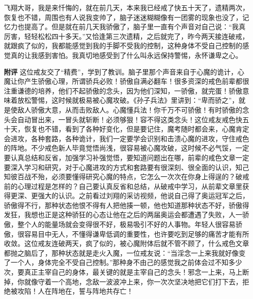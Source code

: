 \begin{case}
    飞翔大哥，我是来忏悔的，就在前几天，本来我已经戒了快五十天了，遗精两次，恢复也不错，周围也有人说我变帅了，脑子迷迷糊糊像有一团雾的现象也没了，记忆力也提高了。但是就在前几天我骄傲了，脑子里一直有个声音对自己说：“我真厉害，轻轻松松四十多天。”又恰逢第三次遗精，之后就完了，昨今两天接连破戒，就跟疯了似的，我都能感觉到我的手脚不受我的控制，这种身体不受自己控制的感觉真的让我感到害怕。我真切地感受到了什么叫永远保持警惕，永怀谦卑之心。

    \textbf{附评} 这位戒友交了“精费”，学到了教训。脑子里那个声音来自于心魔的诡计，心魔让你产生骄傲心理，所谓骄兵必败！骄傲自满必翻车！很多资深的戒色前辈都很注重谦德的培养，他们不起骄傲的念头，因为他们深知，一骄傲，就完蛋！骄傲意味着放松警惕，这时候就极易被心魔攻破。《孙子兵法》里讲到：“卑而骄之”，就是使敌人骄傲大意，从而击败敌人。心魔懂兵法！你千万不可骄傲！有时骄傲的念头会自动冒出来，一冒头就斩断！必须够狠！容不得这类念头！这位戒友戒色快五十天，恢复也不错，看到了各种好变化，但是要记住，魔考随时都会来，心魔肯定会进攻，各种套路，各种诡计，我们一定要学会识别和击溃心魔的进攻，守住戒色的阵地。不少戒色新人毕竟觉悟尚浅，很容易被心魔攻破，这时候不必气馁，一定要认真总结和反省，加强学习补强觉悟，要知道问题出在哪，前辈的戒色文章一定要深入学习和研究，对于心魔进攻的方式和套路要有很深刻、很全面的认识，知己知彼百战不殆，必须要懂得研究心魔的特点，它怎么一次次在你身上得逞的？破戒前的心理过程是怎样的？自己要认真反省和总结，从破戒中学习，从前辈文章里获得更深、更强大的认识。之前看过刘翔的采访视频，他说自己得了奥运冠军之后，骄傲得不行，那种状态他恨不得有人把他揍一顿，他也知道那种状态不好，骄傲得发狂，我想也正是这种骄狂的心态让他在之后的两届奥运会都遭遇了失败，人一骄傲，整个人的能量场就会变得很不好，极易吸引不好的人事物。年轻人很容易骄傲，很容易目中无人，不懂得谦卑低调的重要性，也许要吃到足够的痛苦才能有所收敛。这位戒友连破两天，疯了似的，被心魔附体后就不管不顾了，什么戒色文章都抛之脑后了，那种状态就是走火入魔，一位戒友说：“当淫念一上来我就好像变了一个人，身体完全不受自己控制。”那种身不由己的感觉我之前体会过不知多少次，要真正主宰自己的身体，最关键的就是主宰自己的念头！邪念一上来，马上断掉，你就像守着一个高地，念敌一波波冲上来，你一次次坚决地把它们打下去，拒绝被攻陷！人在阵地在，誓与阵地共存亡！
\end{case}

